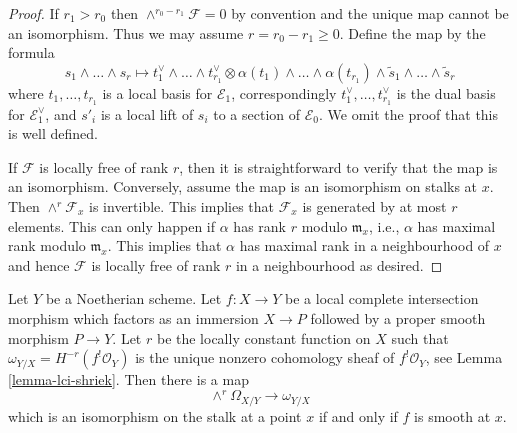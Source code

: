 \begin{proof}
If $r_1 > r_0$ then $\wedge^{r_0 - r_1}\mathcal{F} = 0$ by convention
and the unique map cannot be an isomorphism. Thus we may assume
$r = r_0 - r_1 \geq 0$. Define the map by the formula
$$
s_1 \wedge \ldots \wedge s_r \mapsto
t_1^\vee \wedge \ldots \wedge t_{r_1}^\vee \otimes
\alpha(t_1) \wedge \ldots \wedge \alpha(t_{r_1}) \wedge
\tilde s_1 \wedge \ldots \wedge \tilde s_r
$$
where $t_1, \ldots, t_{r_1}$ is a local basis for $\mathcal{E}_1$,
correspondingly
$t_1^\vee, \ldots, t_{r_1}^\vee$ is the dual basis for $\mathcal{E}_1^\vee$,
and $s'_i$ is a local lift of $s_i$ to a section of $\mathcal{E}_0$.
We omit the proof that this is well defined.

\medskip\noindent
If $\mathcal{F}$ is locally free of rank $r$, then it is straightforward
to verify that the map is an isomorphism. Conversely, assume the map
is an isomorphism on stalks at $x$. Then $\wedge^r\mathcal{F}_x$
is invertible. This implies that $\mathcal{F}_x$ is generated by
at most $r$ elements. This can only happen if $\alpha$ has rank
$r$ modulo $\mathfrak m_x$, i.e., $\alpha$ has maximal rank modulo
$\mathfrak m_x$. This implies that $\alpha$ has maximal rank
in a neighbourhood of $x$ and hence $\mathcal{F}$ is locally free
of rank $r$ in a neighbourhood as desired.
\end{proof}

\begin{lemma}
\label{lemma-fundamental-class-lci}
Let $Y$ be a Noetherian scheme. Let $f : X \to Y$ be a
local complete intersection morphism which factors
as an immersion $X \to P$ followed by a proper smooth morphism $P \to Y$.
Let $r$ be the locally constant function on
$X$ such that $\omega_{Y/X} = H^{-r}(f^!\mathcal{O}_Y)$
is the unique nonzero cohomology sheaf of $f^!\mathcal{O}_Y$, see
Lemma \ref{lemma-lci-shriek}.
Then there is a map
$$
\wedge^r\Omega_{X/Y} \longrightarrow \omega_{Y/X}
$$
which is an isomorphism on the stalk at a point $x$ if and only
if $f$ is smooth at $x$.
\end{lemma}

